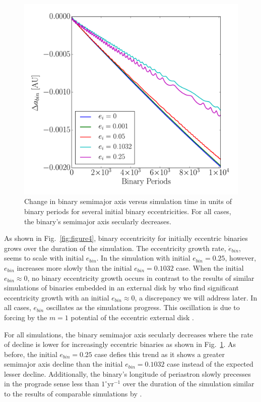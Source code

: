 \begin{figure}
	\includegraphics[width=\columnwidth]{f7}
    \caption{Change in binary semimajor axis versus simulation time in units of binary periods for several initial binary eccentricities. For all cases, the binary's semimajor axis secularly decreases.}
    \label{fig:figure7}
\end{figure}

As shown in Fig.~\ref{fig:figure4}, binary eccentricity for
initially eccentric binaries grows over the duration
of the simulation.  The eccentricity growth rate, $\dot{e}_{bin}$,
seems to scale with initial $e_{bin}$.  In the simulation with initial
$e_{bin} = 0.25$, however, $e_{bin}$ increases more slowly than the
initial $e_{bin} = 0.1032$ case.  When the initial $e_{bin} \approx
0$, no binary eccentricity growth occurs in contrast to the results of
similar simulations of binaries embedded in an external disk by
\citet{Papaloizou01,PierensNelson07,Cuadra2009} who find significant
eccentricity growth with an initial $e_{bin} \approx 0$, a discrepancy
we will address later.  In all cases, $e_{bin}$ oscillates as the simulations progress.  This oscillation is due to forcing by the $m = 1$ potential of the eccentric 
external disk \citep{Arty2000}.

For all simulations, the binary semimajor axis secularly decreases where the rate of decline is lower for increasingly eccentric binaries as shown in Fig.~\ref{fig:figure7}.  As before, the initial $e_{bin} = 0.25$ case defies this trend as it shows a greater semimajor axis decline than the initial $e_{bin} = 0.1032$ case instead of the expected lesser decline.  Additionally, the binary's longitude of periastron slowly precesses in the prograde sense less than $1^{\circ}$yr$^{-1}$ over the duration of the simulation similar to the results of comparable simulations by \citet{Kley2015}.

